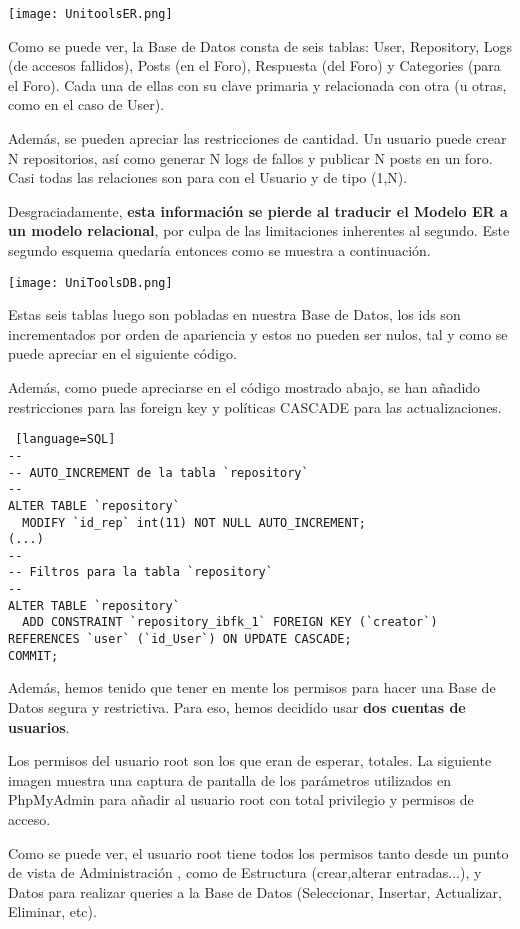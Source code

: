 \documentclass[12pt]{report}
\begin{document}
\texttt{[image: UnitoolsER.png]}

Como se puede ver, la Base de Datos consta de seis tablas: User, Repository, Logs (de accesos fallidos), Posts (en el Foro), Respuesta (del Foro) y Categories (para el Foro). Cada una de ellas con su clave primaria y relacionada con otra (u otras, como en el caso de User). 

Además, se pueden apreciar las restricciones de cantidad. Un usuario puede crear N repositorios, así como generar N logs de fallos y publicar N posts en un foro. Casi todas las relaciones son para con el Usuario y de tipo (1,N). 

Desgraciadamente, \textbf{esta información se pierde al traducir el Modelo ER a un modelo relacional}, por culpa de las limitaciones inherentes al segundo. Este segundo esquema quedaría entonces como se muestra a continuación.
\newline

\texttt{[image: UniToolsDB.png]}

Estas seis tablas luego son pobladas en nuestra Base de Datos, los ids son incrementados por orden de apariencia y estos no pueden ser nulos, tal y como se puede apreciar en el siguiente código.

Además, como puede apreciarse en el código mostrado abajo, se han añadido restricciones para las foreign key y políticas CASCADE para las actualizaciones.
\newline

\begin{lstlisting} [language=SQL]
--
-- AUTO_INCREMENT de la tabla `repository`
--
ALTER TABLE `repository`
  MODIFY `id_rep` int(11) NOT NULL AUTO_INCREMENT;
(...)
--
-- Filtros para la tabla `repository`
--
ALTER TABLE `repository`
  ADD CONSTRAINT `repository_ibfk_1` FOREIGN KEY (`creator`) REFERENCES `user` (`id_User`) ON UPDATE CASCADE;
COMMIT;
\end{lstlisting}

Además, hemos tenido que tener en mente los permisos para hacer una Base de Datos segura y restrictiva. Para eso, hemos decidido usar \textbf{dos cuentas de usuarios}.

Los permisos del usuario root son los que eran de esperar, totales. La siguiente imagen muestra una captura de pantalla de los parámetros utilizados en PhpMyAdmin para añadir al usuario root con total privilegio y permisos de acceso.

Como se puede ver, el usuario root tiene todos los permisos tanto desde un punto de vista de Administración , como de Estructura (crear,alterar entradas...), y Datos para realizar queries a la Base de Datos (Seleccionar, Insertar, Actualizar, Eliminar, etc).
\end{document}
